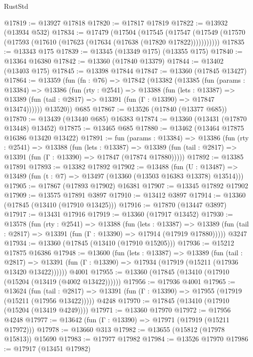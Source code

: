 \begin{lexlean}{RustStd}
\begin{coremodule}
@17819 := @13927 @17818
@17820 := @17817 @17819
@17822 := @13932 (@13934 @532)
@17834 := @17479
    (@17504
      (@17545
        (@17547 (@17549 (@17570 (@17593 (@17610 (@17623 (@17634 (@17638 (@17820 @17822)))))))))))
@17835 := @13343 @175
@17839 := @13345 (@13349 @175) (@13355 @175)
@17840 := @13364 @16380
@17842 := @13360 (@17840 @13379)
@17844 := @13402 (@13403 @175)
@17845 := @13398 @17844
@17847 := @13360 (@17845 @13427)
@17864 := @13359
    (fun (fn : @76) =>
    @17842
      (@13382
        (@13385
          (fun (params : @13384) =>
          @13386
            (fun (rty : @2541) =>
            @13388
              (fun (lets : @13387) =>
              @13389 (fun (tail : @2817) => @13391 (fun (Γ : @13390) => @17847 @13474))))))
        @13520))
    @685
@17867 := @13526 (@17840 (@13377 @685))
@17870 := @13439 (@13440 @685) @16383
@17874 := @13360 (@13431 (@17870 @13448) @13452)
@17875 := @13465 @685
@17880 := @13462 (@13464 @17875 @16386 @13420 @13422)
@17891 := fun (params : @13384) =>
  @13386
    (fun (rty : @2541) =>
    @13388
      (fun (lets : @13387) =>
      @13389 (fun (tail : @2817) => @13391 (fun (Γ : @13390) => @17847 (@17874 @17880)))))
@17892 := @13385 @17891
@17893 := @13382 @17892
@17902 := @13488
    (fun (U : @13487) => @13489 (fun (t : @7) => @13497 (@13360 (@13503 @16383 @13378) @13514)))
@17905 := @17867 (@17893 @17902) @16381
@17907 := @13345 @17892 @17902
@17909 := @13575 @17891 @3897
@17910 := @13412 @3897
@17914 := @13360 (@17845 (@13410 (@17910 @13425)))
@17916 := @17870 (@13447 @3897)
@17917 := @13431 @17916
@17919 := @13360 (@17917 @13452)
@17930 := @13578
    (fun (rty : @2541) =>
    @13388
      (fun (lets : @13387) =>
      @13389 (fun (tail : @2817) => @13391 (fun (Γ : @13390) => @17914 (@17919 @17880)))))
    @3247
@17934 := @13360 (@17845 (@13410 (@17910 @15205)))
@17936 := @15212 @17875 @16386
@17948 := @13600
    (fun (lets : @13387) =>
    @13389
      (fun (tail : @2817) =>
      @13391 (fun (Γ : @13390) => @17934 (@17919 (@15211 (@17936 @13420 @13422))))))
    @4001
@17955 := @13360 (@17845 (@13410 (@17910 (@15204 (@13419 (@4002 @13422))))))
@17956 := @17936 @4001
@17965 := @13624
    (fun (tail : @2817) => @13391 (fun (Γ : @13390) => @17955 (@17919 (@15211 (@17956 @13422)))))
    @4248
@17970 := @17845 (@13410 (@17910 (@15204 (@13419 @4249))))
@17971 := @13360 @17970
@17972 := @17956 @4248
@17977 := @13642 (fun (Γ : @13390) => @17971 (@17919 (@15211 @17972)))
@17978 := @13660 @313
@17982 := @13655 (@15812 (@17978 @15813)) @15690
@17983 := @17977 @17982
@17984 := @13526 @17970
@17986 := @17917 (@13451 @17982)

\end{coremodule}
\end{lexlean}
